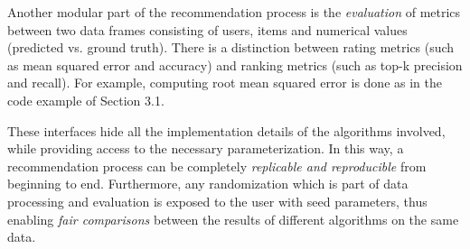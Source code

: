 Another modular part of the recommendation process is the {\em evaluation} of metrics between two data frames consisting of users, items and numerical values 
(predicted vs. ground truth). There is a distinction between rating metrics (such as mean squared error and accuracy) and ranking metrics 
(such as top-k precision and recall). For example, computing root mean squared error is done 
as in the code example of Section 3.1.   
 
These interfaces hide all the implementation details of the algorithms involved, while providing access to the necessary parameterization.
In this way, a recommendation process can be completely {\em replicable and reproducible} from beginning to end. Furthermore, any randomization 
which is part of data processing and evaluation is exposed to the user with seed parameters, thus enabling {\em fair comparisons} between the results of different algorithms
on the same data. 

